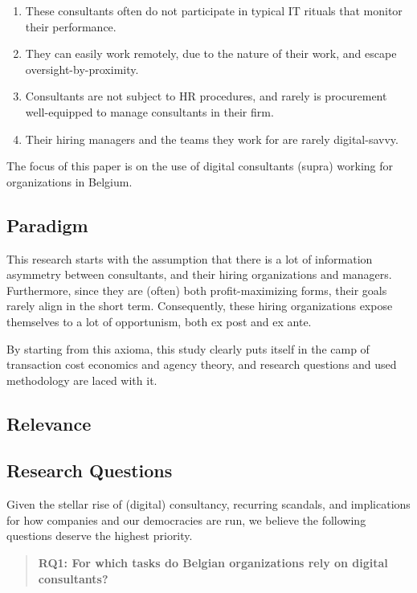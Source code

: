 \documentclass[12pt]{article}
\providecommand{\tightlist}{%
  \setlength{\itemsep}{0pt}\setlength{\parskip}{0pt}}
\begin{document}
\begin{enumerate}
\def\labelenumi{\arabic{enumi}.}
\tightlist
\item
  These consultants often do not participate in typical IT rituals that
  monitor their performance.
\item
  They can easily work remotely, due to the nature of their work, and
  escape oversight-by-proximity.
\item
  Consultants are not subject to HR procedures, and rarely is
  procurement well-equipped to manage consultants in their firm.
\item
  Their hiring managers and the teams they work for are rarely
  digital-savvy.
\end{enumerate}

The focus of this paper is on the use of digital consultants (supra)
working for organizations in Belgium.

\subsection{Paradigm}\label{paradigm}

This research starts with the assumption that there is a lot of
information asymmetry between consultants, and their hiring
organizations and managers. Furthermore, since they are (often) both
profit-maximizing forms, their goals rarely align in the short term.
Consequently, these hiring organizations expose themselves to a lot of
opportunism, both ex post and ex ante.

By starting from this axioma, this study clearly puts itself in the camp
of transaction cost economics and agency theory, and research questions
and used methodology are laced with it.

\subsection{Relevance}\label{relevance}

\subsection{Research Questions}\label{research-questions}

Given the stellar rise of (digital) consultancy, recurring scandals, and
implications for how companies and our democracies are run, we believe
the following questions deserve the highest priority.

\begin{quote}
\textbf{RQ1: For which tasks do Belgian organizations rely on digital
consultants?}
\end{quote}
\end{document}
